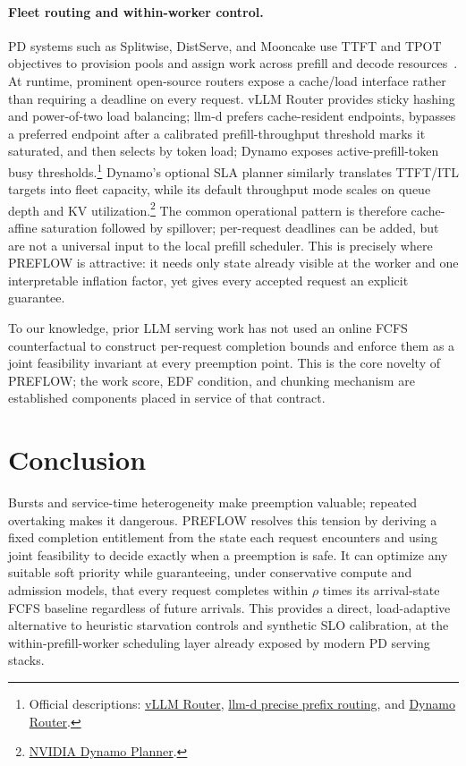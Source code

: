 \documentclass{article}
\newcommand{\preflow}{\textnormal{\textsc{PREFLOW}}}
\begin{document}
\paragraph{Fleet routing and within-worker control.}
PD systems such as Splitwise, DistServe, and Mooncake use TTFT and TPOT
objectives to provision pools and assign work across prefill and decode
resources~\citep{patel2024splitwise,zhong2024distserve,qin2024mooncake}.  At
runtime, prominent open-source routers expose a cache/load interface rather than
requiring a deadline on every request.  vLLM Router provides sticky hashing and
power-of-two load balancing; llm-d prefers cache-resident endpoints, bypasses a
preferred endpoint after a calibrated prefill-throughput threshold marks it
saturated, and then selects by token load; Dynamo exposes active-prefill-token
busy thresholds.\footnote{Official descriptions:
\href{https://vllm.ai/blog/2025-12-13-vllm-router-release}{vLLM Router},
\href{https://github.com/llm-d/llm-d/blob/main/guides/precise-prefix-cache-routing/README.md}{llm-d precise prefix routing}, and
\href{https://docs.nvidia.com/dynamo/v-0-9-1/components/router/router-guide}{Dynamo Router}.}
Dynamo's optional SLA planner similarly translates TTFT/ITL targets into fleet
capacity, while its default throughput mode scales on queue depth and KV
utilization.\footnote{\href{https://docs.nvidia.com/dynamo/dev/knowledge-base/modular-components/planner/overview}{NVIDIA Dynamo Planner}.}
The common operational pattern is therefore cache-affine saturation followed by
spillover; per-request deadlines can be added, but are not a universal input to
the local prefill scheduler.  This is precisely where \preflow{} is attractive:
it needs only state already visible at the worker and one interpretable
inflation factor, yet gives every accepted request an explicit guarantee.

To our knowledge, prior LLM serving work has not used an online FCFS
counterfactual to construct per-request completion bounds and enforce them as a
joint feasibility invariant at every preemption point.  This is the core
novelty of \preflow{}; the work score, EDF condition, and chunking mechanism are
established components placed in service of that contract.

\section{Conclusion}
\label{sec:conclusion}

Bursts and service-time heterogeneity make preemption valuable; repeated
overtaking makes it dangerous.  \preflow{} resolves this tension by deriving a
fixed completion entitlement from the state each request encounters and using
joint feasibility to decide exactly when a preemption is safe.  It can optimize
any suitable soft priority while guaranteeing, under conservative compute and
admission models, that every request completes within $\rho$ times its
arrival-state FCFS baseline regardless of future arrivals.  This provides a
direct, load-adaptive alternative to heuristic starvation controls and
synthetic SLO calibration, at the within-prefill-worker scheduling layer
already exposed by modern PD serving stacks.
\end{document}
